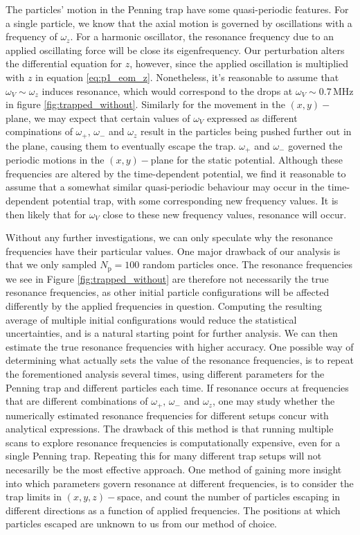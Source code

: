 The particles' motion in the Penning trap have some quasi-periodic features. For a single particle, we know that the axial motion is governed by oscillations with a frequency of $\omega_z$. For a harmonic oscillator, the resonance frequency due to an applied oscillating force will be close its eigenfrequency. Our perturbation alters the differential equation for $z$, however, since the applied oscillation is multiplied with $z$ in equation \eqref{eq:p1_eom_z}. Nonetheless, it's reasonable to assume that $\omega_V\sim\omega_z$ induces resonance, which would correspond to the drops at $\omega_V\sim0.7\,\mathrm{MHz}$ in figure \ref{fig:trapped_without}. Similarly for the movement in the $(x,y)-$plane, we may expect that certain values of $\omega_V$ expressed as different compinations of $\omega_+,\,\omega_-$ and $\omega_z$ result in the particles being pushed further out in the plane, causing them to eventually escape the trap. $\omega_+$ and $\omega_-$ governed the periodic motions in the $(x,y)-$plane for the static potential. Although these frequencies are altered by the time-dependent potential, we find it reasonable to assume that a somewhat similar quasi-periodic behaviour may occur in the time-dependent potential trap, with some corresponding new frequency values. It is then likely that for $\omega_V$ close to these new frequency values, resonance will occur. 


Without any further investigations, we can only speculate why the resonance frequencies have their particular values. One major drawback of our analysis is that we only sampled $N_\mathrm{p}=100$ random particles once. The resonance frequencies we see in Figure \ref{fig:trapped_without} are therefore not necessarily the true resonance frequencies, as other initial particle configurations will be affected differently by the applied frequencies in question. Computing the resulting average of multiple initial configurations would reduce the statistical uncertainties, and is a natural starting point for further analysis. We can then estimate the true resonance frequencies with higher accuracy. One possible way of determining what actually sets the value of the resonance frequencies, is to repeat the forementioned analysis several times, using different parameters for the Penning trap and different particles each time. If resonance occurs at frequencies that are different combinations of $\omega_+,\,\omega_-$ and $\omega_z$, one may study whether the numerically estimated resonance frequencies for different setups concur with analytical expressions. The drawback of this method is that 
running multiple scans to explore resonance frequencies is computationally expensive, even for a single Penning trap. Repeating this for many different trap setups will not necesarilly be the most effective approach. One method of gaining more insight into which parameters govern resonance at different frequencies, is to consider the trap limits in $(x,y,z)-$space, and count the number of particles escaping in different directions as a function of applied frequencies. The positions at which particles escaped are unknown to us from our method of choice.     

